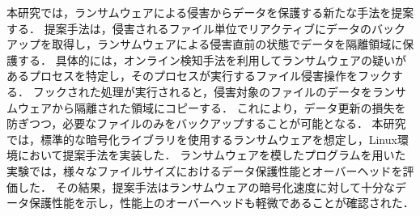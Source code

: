 本研究では，ランサムウェアによる侵害からデータを保護する新たな手法を提案する．
提案手法は，侵害されるファイル単位でリアクティブにデータのバックアップを取得し，ランサムウェアによる侵害直前の状態でデータを隔離領域に保護する．
具体的には，オンライン検知手法を利用してランサムウェアの疑いがあるプロセスを特定し，そのプロセスが実行するファイル侵害操作をフックする．
フックされた処理が実行されると，侵害対象のファイルのデータをランサムウェアから隔離された領域にコピーする．
これにより，データ更新の損失を防ぎつつ，必要なファイルのみをバックアップすることが可能となる．
% 
本研究では，標準的な暗号化ライブラリを使用するランサムウェアを想定し，Linux環境において提案手法を実装した．
ランサムウェアを模したプログラムを用いた実験では，様々なファイルサイズにおけるデータ保護性能とオーバーヘッドを評価した．
その結果，提案手法はランサムウェアの暗号化速度に対して十分なデータ保護性能を示し，性能上のオーバーヘッドも軽微であることが確認された．

